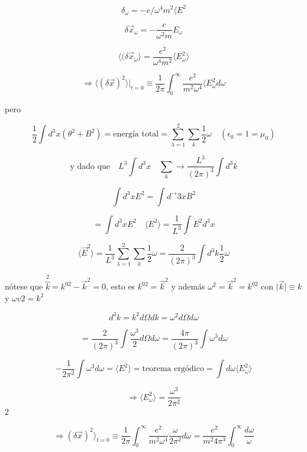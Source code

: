 \documentclass{report}
\begin{document}
\[\delta_{\omega} = -e/ \omega ^4 m^2 \langle E^{2}\]

\[\delta \vec{x}_{\omega} = - \frac{e}{\omega ^2 m} E_{\omega }\]

\begin{equation}
\langle ( \delta \vec{x}_{\omega} \rangle =\frac{e^2 }{\omega ^{4}m^{2}} \langle E^{2}_{\omega} \rangle
\end{equation}

\[\Rightarrow \langle (\delta \vec{x})^2 \rangle \vert _{t=0} \equiv \frac{1}{2 \pi } \int _{0}^{\infty } \frac{e^2 }{m^ 2 \omega ^ 4} \langle E_{\omega }^{2} d \omega \]

pero

\[\frac{1}{2} \int d^{3} x (\theta ^{2} + B^{2}) = \text{energía total} = \sum_{\lambda =1}^{2} \sum _{k} \frac{1}{2} \omega \quad (\epsilon _{0} = 1 = \mu _0 )\]

\[\text{y dado que} \quad L^3 \int d^3 x \quad \sum _{k} \rightarrow \frac{L^3}{(2 \pi)^3 } \int d^3 k\]

\[ \int d^3 x E^2 = \int d^\rightarrow3 x B^2 \]

\[= \int d^3 x E ^2 \quad \langle E^2 \rangle = \frac{1}{L^3} \int E^2 d^3 x\]

\[\langle \vec{E} ^2 \rangle = \frac{1}{L^3 } \sum _{\lambda = 1}^{2} \sum _{k} \frac{1}{2} \omega = \frac{2}{(2\pi )^3 } \int d^3 k \frac{1}{2} \omega \]

nótese que $\overbrace{k} ^2 = k^{02} - \vec{k}^2 = 0$, esto es $k^{02} = \vec{k}^2$ y además $\omega ^2 = \vec{k} ^2 = k^{02}$ con $\vert \vec{k} \vert \equiv k$ y $\omega v2 = k^2$

\[d^3 k = k^2 d \Omega dk = \omega ^2 d \Omega d \omega\]

\[= \frac{2}{(2 \pi)^3 } \int \frac{\omega ^3}{2} d \Omega d \omega = \frac{4 \pi}{(2 \pi)^3 } \int \omega ^3 d \omega \]

\[- \frac{1}{2 \pi ^2 } \int \omega ^3 d \omega = \langle E ^2 \rangle = \text{teorema ergódico} = \int d \omega \langle E^{2}_{\omega} \rangle \]

\begin{equation}
\Rightarrow \langle E^2 _{\omega} \rangle = \frac{\omega ^3 }{2 \pi ^2}
\end{equation}2 

\[ \Rightarrow ( \delta \vec{x}) ^2 \rangle _{t=0} \equiv \frac{1}{2 \pi } \int _{0}^{\infty } \frac{e^2 }{m^2 \omega ^4 } \frac{\omega}{2 \pi ^2 } d \omega = \frac{e^2 }{m^2 4 \pi ^3 } \int _{0}^{\infty} \frac{d \omega}{\omega} \]
\end{document}
